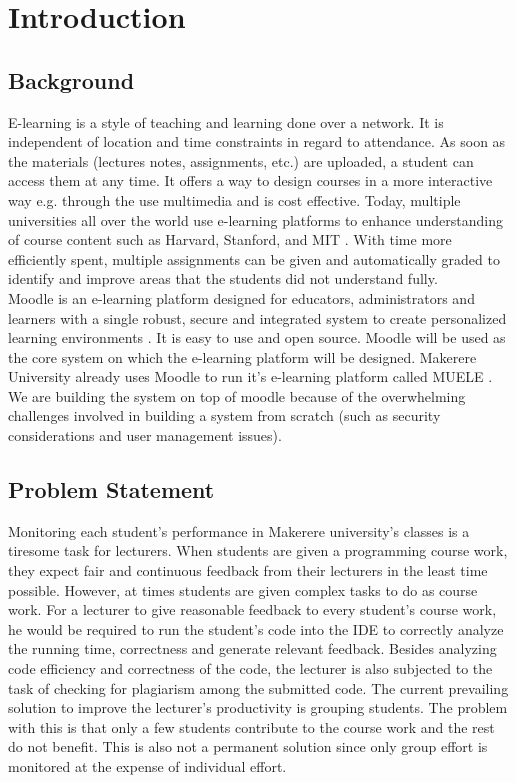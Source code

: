 \documentclass[12pt]{article}
\begin{document}
\section{Introduction}
	\subsection{Background}
		E-learning is a style of teaching and learning done over a network. It is independent of location and time constraints in regard to attendance. As soon as the materials (lectures notes, assignments, etc.) are uploaded, a student can access them at any time. It offers a way to design courses in a more interactive way e.g. through the use multimedia and is cost effective. Today, multiple universities all over the world use e-learning platforms to enhance understanding of course content such as Harvard, Stanford, and MIT \cite{singh}. With time more efficiently spent, multiple assignments can be given and automatically graded to identify and improve areas that the students did not understand fully.\\
		
		\noindent Moodle is an e-learning platform designed for educators, administrators and learners with a single robust, secure and integrated system to create personalized learning environments \cite{moodle}. It is easy to use and open source. Moodle will be used as the core system on which the e-learning platform will be designed. Makerere University already uses Moodle to run it's e-learning platform called MUELE \cite{muele}. We are building the system on top of moodle because of the overwhelming challenges involved in building a system from scratch (such as security considerations and user management issues).
	\subsection{Problem Statement}
		Monitoring each student's performance in Makerere university's classes is a tiresome task for lecturers. When students are given a programming course work, they expect fair and continuous feedback from their lecturers in the least time possible. However, at times students are given complex tasks to do as course work. For a lecturer to give reasonable feedback to every student's course work, he would be required to run the student’s code into the IDE to correctly analyze the running time, correctness and generate relevant feedback. Besides analyzing code efficiency and correctness of the code, the lecturer is also subjected to the task of checking for plagiarism among the submitted code. The current prevailing solution to improve the lecturer's productivity is grouping students. The problem with this is that only a few students contribute to the course work and the rest do not benefit. This is also not a permanent solution since only group effort is monitored at the expense of individual effort.\\
		
\end{document}

